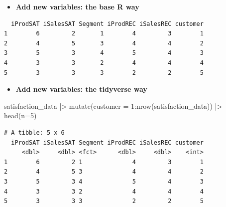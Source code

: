 \documentclass[
  ignorenonframetext,
]{beamer}
\newenvironment{Shaded}{\begin{snugshade}}{\end{snugshade}}
\newcommand{\AttributeTok}[1]{\textcolor[rgb]{0.40,0.45,0.13}{#1}}
\newcommand{\DecValTok}[1]{\textcolor[rgb]{0.68,0.00,0.00}{#1}}
\newcommand{\FunctionTok}[1]{\textcolor[rgb]{0.28,0.35,0.67}{#1}}
\newcommand{\NormalTok}[1]{\textcolor[rgb]{0.00,0.23,0.31}{#1}}
\newcommand{\OtherTok}[1]{\textcolor[rgb]{0.00,0.23,0.31}{#1}}
\newcommand{\SpecialCharTok}[1]{\textcolor[rgb]{0.37,0.37,0.37}{#1}}
\providecommand{\tightlist}{%
  \setlength{\itemsep}{0pt}\setlength{\parskip}{0pt}}\usepackage{longtable,booktabs,array}
\begin{document}
\begin{frame}[fragile]{}
\label{section-12}
\begin{itemize}
\tightlist
\item
  \textbf{Add new variables: the base R way}
\end{itemize}

\tiny

\begin{Shaded}
\end{Shaded}

\begin{verbatim}
  iProdSAT iSalesSAT Segment iProdREC iSalesREC customer
1        6         2       1        4         3        1
2        4         5       3        4         4        2
3        5         3       4        5         4        3
4        3         3       2        4         4        4
5        3         3       3        2         2        5
\end{verbatim}

\normalsize

\begin{itemize}
\tightlist
\item
  \textbf{Add new variables: the tidyverse way}
\end{itemize}

\tiny

\begin{Shaded}
\begin{Highlighting}[]
\NormalTok{satisfaction\_data }\SpecialCharTok{|\textgreater{}}
  \FunctionTok{mutate}\NormalTok{(}\AttributeTok{customer =} \DecValTok{1}\SpecialCharTok{:}\FunctionTok{nrow}\NormalTok{(satisfaction\_data)) }\SpecialCharTok{|\textgreater{}} 
  \FunctionTok{head}\NormalTok{(}\AttributeTok{n=}\DecValTok{5}\NormalTok{)}
\end{Highlighting}
\end{Shaded}

\begin{verbatim}
# A tibble: 5 x 6
  iProdSAT iSalesSAT Segment iProdREC iSalesREC customer
     <dbl>     <dbl> <fct>      <dbl>     <dbl>    <int>
1        6         2 1              4         3        1
2        4         5 3              4         4        2
3        5         3 4              5         4        3
4        3         3 2              4         4        4
5        3         3 3              2         2        5
\end{verbatim}
\end{frame}
\end{document}

